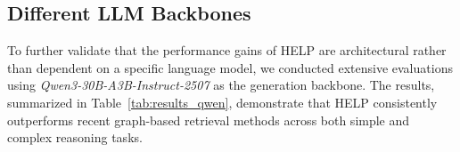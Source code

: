 \subsection{Different LLM Backbones}\label{appendix: different backbones}

To further validate that the performance gains of HELP are architectural rather than dependent on a specific language model, we conducted extensive evaluations using \textit{Qwen3-30B-A3B-Instruct-2507} as the generation backbone. The results, summarized in Table~\ref{tab:results_qwen}, demonstrate that HELP consistently outperforms recent graph-based retrieval methods across both simple and complex reasoning tasks.



